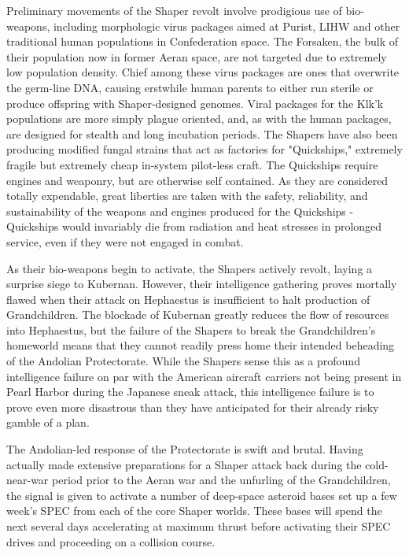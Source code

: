 Preliminary movements of the Shaper revolt involve prodigious use of
bio-weapons, including morphologic virus packages aimed at Purist,
LIHW and other traditional human populations in Confederation
space. The Forsaken, the bulk of their population now in former Aeran
space, are not targeted due to extremely low population density. Chief
among these virus packages are ones that overwrite the germ-line DNA,
causing erstwhile human parents to either run sterile or produce
offspring with Shaper-designed genomes. Viral packages for the Klk'k
populations are more simply plague oriented, and, as with the human
packages, are designed for stealth and long incubation periods. The
Shapers have also been producing modified fungal strains that act as
factories for "Quickships," extremely fragile but extremely cheap
in-system pilot-less craft. The Quickships require engines and
weaponry, but are otherwise self contained. As they are considered
totally expendable, great liberties are taken with the safety,
reliability, and sustainability of the weapons and engines produced
for the Quickships - Quickships would invariably die from radiation
and heat stresses in prolonged service, even if they were not engaged
in combat.

As their bio-weapons begin to activate, the Shapers actively revolt,
laying a surprise siege to Kubernan. However, their intelligence
gathering proves mortally flawed when their attack on Hephaestus is
insufficient to halt production of Grandchildren. The blockade of
Kubernan greatly reduces the flow of resources into Hephaestus, but
the failure of the Shapers to break the Grandchildren's homeworld
means that they cannot readily press home their intended beheading of
the Andolian Protectorate. While the Shapers sense this as a profound
intelligence failure on par with the American aircraft carriers not
being present in Pearl Harbor during the Japanese sneak attack, this
intelligence failure is to prove even more disastrous than they have
anticipated for their already risky gamble of a plan.

The Andolian-led response of the Protectorate is swift and
brutal. Having actually made extensive preparations for a Shaper attack
back during the cold-near-war period prior to the Aeran war and the
unfurling of the Grandchildren, the signal is given to activate a
number of deep-space asteroid bases set up a few week's SPEC from each
of the core Shaper worlds. These bases will spend the next several
days accelerating at maximum thrust before activating their SPEC
drives and proceeding on a collision course.

